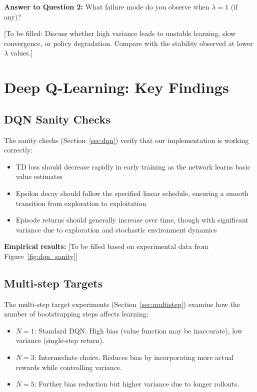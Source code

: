 \documentclass[11pt, a4paper, oneside]{memoir}
\begin{document}
\textbf{Answer to Question 2:} What failure mode do you observe when $\lambda = 1$ (if any)?

[To be filled: Discuss whether high variance leads to unstable learning, slow convergence, or policy degradation. Compare with the stability observed at lower $\lambda$ values.]

\section{Deep Q-Learning: Key Findings}

\subsection{DQN Sanity Checks}

The sanity checks (Section~\ref{sec:dqn}) verify that our implementation is working correctly:
\begin{itemize}
\item TD loss should decrease rapidly in early training as the network learns basic value estimates
\item Epsilon decay should follow the specified linear schedule, ensuring a smooth transition from exploration to exploitation
\item Episode returns should generally increase over time, though with significant variance due to exploration and stochastic environment dynamics
\end{itemize}

\textbf{Empirical results:} [To be filled based on experimental data from Figure~\ref{fig:dqn_sanity}]

\subsection{Multi-step Targets}

The multi-step target experiments (Section~\ref{sec:multistep}) examine how the number of bootstrapping steps affects learning:

\begin{itemize}
\item $N=1$: Standard DQN. High bias (value function may be inaccurate), low variance (single-step return).
\item $N=3$: Intermediate choice. Reduces bias by incorporating more actual rewards while controlling variance.
\item $N=5$: Further bias reduction but higher variance due to longer rollouts.
\end{itemize}
\end{document}
